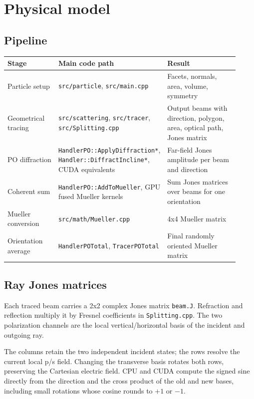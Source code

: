 \documentclass[
  10pt,
  a4paper,
]{article}
\begin{document}
\section{Physical model}\label{physical-model}

\subsection{Pipeline}\label{pipeline}

\begin{longtable}[]{@{}L{0.24\linewidth}L{0.28\linewidth}L{0.40\linewidth}@{}}
\toprule\noalign{}
Stage & Main code path & Result \\
\midrule\noalign{}
\endhead
\bottomrule\noalign{}
\endlastfoot
Particle setup & \texttt{src/particle}, \texttt{src/main.cpp} & Facets,
normals, area, volume, symmetry \\
Geometrical tracing & \texttt{src/scattering}, \texttt{src/tracer},
\texttt{src/Splitting.cpp} & Output beams with direction, polygon, area,
optical path, Jones matrix \\
PO diffraction & \nolinkurl{HandlerPO::ApplyDiffraction*},
\nolinkurl{Handler::DiffractIncline*}, CUDA equivalents & Far-field Jones
amplitude per beam and direction \\
Coherent sum & \texttt{HandlerPO::AddToMueller}, GPU fused Mueller
kernels & Sum Jones matrices over beams for one orientation \\
Mueller conversion & \texttt{src/math/Mueller.cpp} & 4x4 Mueller
matrix \\
Orientation average & \texttt{HandlerPOTotal}, \texttt{TracerPOTotal} &
Final randomly oriented Mueller matrix \\
\end{longtable}

\subsection{Ray Jones matrices}\label{ray-jones-matrices}

Each traced beam carries a 2x2 complex Jones matrix \texttt{beam.J}.
Refraction and reflection multiply it by Fresnel coefficients in
\texttt{Splitting.cpp}. The two polarization channels are the local
vertical/horizontal basis of the incident and outgoing ray.

The columns retain the two independent incident states; the rows resolve the
current local p/s field. Changing the transverse basis rotates both rows,
preserving the Cartesian electric field. CPU and CUDA compute the signed sine
directly from the direction and the cross product of the old and new bases,
including small rotations whose cosine rounds to $+1$ or $-1$.
\end{document}
